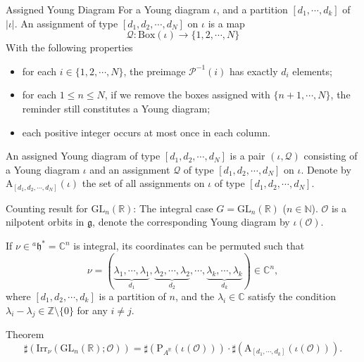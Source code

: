 \documentclass[fleqn,xcolor=dvipsnames]{beamer}
\newcommand{\BC}{{\mathbb {C}}}
\newcommand{\BN}{{\mathbb {N}}}
\newcommand{\BR}{{\mathbb {R}}}
\newcommand{\BZ}{{\mathbb {Z}}}
\newcommand{\CO}{{\mathcal {O}}}
\newcommand{\CP}{{\mathcal {P}}}
\newcommand{\CQ}{{\mathcal {Q}}}
\newcommand{\RA}{{\mathrm {A}}}
\newcommand{\fg}{\mathfrak{g}}
\newcommand{\fh}{\mathfrak{h}}
\newcommand{\GL}{{\mathrm{GL}}}
\newcommand{\Irr}{{\mathrm{Irr}}}
\begin{document}
\begin{frame}
  \begin{block}{Assigned Young Diagram}
    For a Young diagram $\iota$, and a partition $[d_1, \cdots, d_k]$ of $|\iota|$.  An assignment of type $[d_1,d_2, \cdots, d_N]$ on $\iota$ is a map
   $$\CQ: \mathrm{Box}(\iota) \to \{1,2, \cdots,N\} $$
   With the following properties

   \begin{itemize}
      \item for each $i \in \{1,2,\cdots,N\}$, the preimage $\CP^{-1}(i)$ has exactly $d_i$ elements;
      \item for each $1 \leq n \leq N$, if we remove the boxes assigned with $\{n+1, \cdots, N\}$, the reminder still constitutes a Young diagram;
      \item each positive integer occurs at most once in each column.
   \end{itemize}
    An assigned Young diagram of type $[d_1,d_2, \cdots, d_N]$ is a pair $(\iota,\CQ)$ consisting of a Young diagram $\iota$ and an assignment $\CQ$ of type $[d_1,d_2, \cdots, d_N]$ on $\iota$. Denote by $\RA_{[d_1,d_2,\cdots,d_N]}(\iota)$ the set of all assignments on $\iota$ of type $[d_1,d_2,\cdots,d_N]$.
  \end{block}
\end{frame}



\begin{frame}{Counting result for $\GL_n(\BR)$: The integral case}
  $G = \GL_n(\BR)$ ($n \in \BN$). $\CO$ is a nilpotent orbits in $\fg$, denote the corresponding Young diagram by $\iota(\CO)$.\par
    If $\nu \in {^{a}\fh^*} = \BC^n$ is integral, its coordinates can be permuted such that 
        \[
        \nu = (\underbrace{\lambda_1, \cdots, \lambda_1}_{d_1}, \underbrace{\lambda_2, \cdots, \lambda_2}_{d_2}, \cdots, \underbrace{\lambda_k, \cdots, \lambda_k}_{d_k}) \in \BC^n,
        \]
        where $[d_1, d_2, \cdots , d_k]$ is a partition of $n$, and the $\lambda_i \in \BC$ satisfy the condition $\lambda_i - \lambda_j \in \BZ \setminus \{0\}$ for any $i \neq j$.
  \begin{block}{Theorem}
        \begin{equation*}
            \sharp(\Irr_\nu(\GL_{n}(\BR);\CO)) = \sharp\left(\mathrm{P}_{A^{\BR}}(\iota(\CO))\right)\cdot \sharp\left(\RA_{[d_1,\cdots,d_k]}(\iota(\CO))\right).
        \end{equation*}
  \end{block}
\end{frame}
\end{document}
